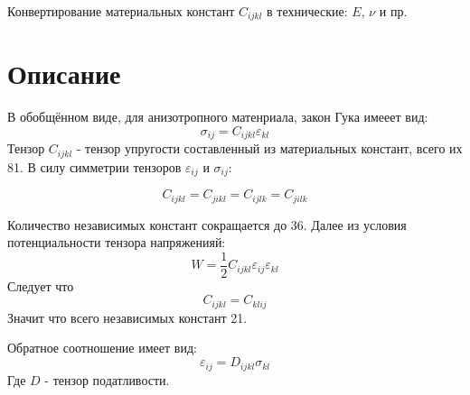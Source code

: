 {~}\bigskip
\begin{center}
    \Huge{
    Конвертирование материальных констант 
$C_{ijkl}$ 
в технические: 
$E$, $\nu$
и пр.}
\end{center}

\section{Описание}
В обобщённом виде, для анизотропного матенриала, закон Гука имееет вид:
\begin{equation}
    \label{eq1}
    \sigma_{ij} = C_{ijkl}\varepsilon_{kl}
\end{equation}
Тензор 
$C_{ijkl}$ 
- тензор упругости составленный из материальных констант, всего их 81.
В силу симметрии тензоров 
$\varepsilon_{ij}$ 
и 
$\sigma_{ij}$:

$$
C_{ijkl} = C_{jikl} = C_{ijlk} = C_{jilk} 
$$

Количество независимых констант сокращается до 36. Далее из условия потенциальности тензора напряженияй:
$$
W=\frac{1}{2}C_{ijkl}\varepsilon_{ij}\varepsilon_{kl}
$$
Следует что 
$$
C_{ijkl} = C_{klij}
$$
Значит что всего независимых констант 21.

Обратное соотношение имеет вид:
$$
\varepsilon_{ij} = D_{ijkl}\sigma_{kl}
$$
Где 
$D$ 
- тензор податливости.

